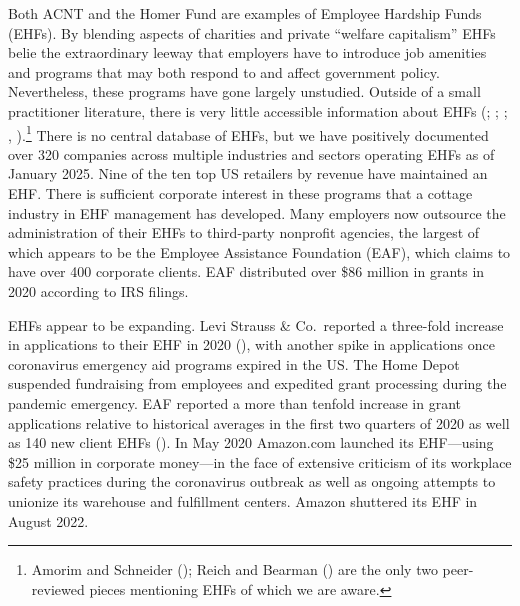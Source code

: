 \documentclass[
  11pt,
  oneside]{article}
\begin{document}
Both ACNT and the Homer Fund are examples of Employee Hardship Funds (EHFs). By blending aspects of charities and private ``welfare capitalism'' EHFs belie the extraordinary leeway that employers have to introduce job amenities and programs that may both respond to and affect government policy. Nevertheless, these programs have gone largely unstudied. Outside of a small practitioner literature, there is very little accessible information about EHFs (; ; ; , ).\footnote{Amorim and Schneider (); Reich and Bearman () are the only two peer-reviewed pieces mentioning EHFs of which we are aware.} There is no central database of EHFs, but we have positively documented over 320 companies across multiple industries and sectors operating EHFs as of January 2025. Nine of the ten top US retailers by revenue have maintained an EHF. There is sufficient corporate interest in these programs that a cottage industry in EHF management has developed. Many employers now outsource the administration of their EHFs to third-party nonprofit agencies, the largest of which appears to be the Employee Assistance Foundation (EAF), which claims to have over 400 corporate clients. EAF distributed over \$86 million in grants in 2020 according to IRS filings.

EHFs appear to be expanding. Levi Strauss \& Co.~reported a three-fold increase in applications to their EHF in 2020 (), with another spike in applications once coronavirus emergency aid programs expired in the US. The Home Depot suspended fundraising from employees and expedited grant processing during the pandemic emergency. EAF reported a more than tenfold increase in grant applications relative to historical averages in the first two quarters of 2020 as well as 140 new client EHFs (). In May 2020 Amazon.com launched its EHF---using \$25 million in corporate money---in the face of extensive criticism of its workplace safety practices during the coronavirus outbreak as well as ongoing attempts to unionize its warehouse and fulfillment centers. Amazon shuttered its EHF in August 2022.
\end{document}
